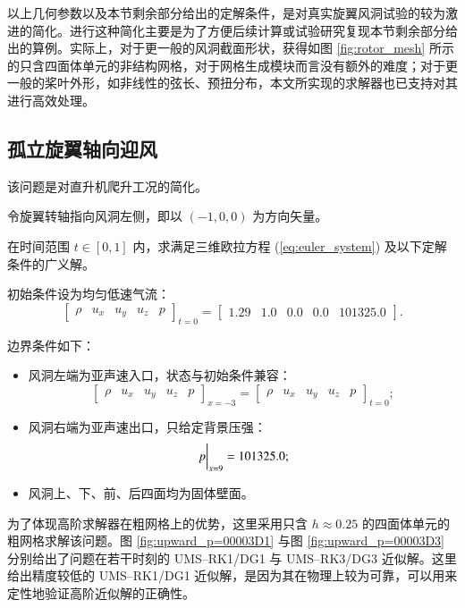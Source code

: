 以上几何参数以及本节剩余部分给出的定解条件，是对真实旋翼风洞试验的较为激进的简化。进行这种简化主要是为了方便后续计算或试验研究复现本节剩余部分给出的算例。实际上，对于更一般的风洞截面形状，获得如图
\ref{fig:rotor_mesh} 所示的只含四面体单元的非结构网格，对于网格生成模块而言没有额外的难度；对于更一般的桨叶外形，如非线性的弦长、预扭分布，本文所实现的求解器也已支持对其进行高效处理。

\subsection{孤立旋翼轴向迎风}

该问题是对直升机爬升工况的简化。
\begin{problem}
[孤立旋翼轴向迎风]\label{prob:=005B64=007ACB=0065CB=007FFC=008F74=005411=008FCE=0098CE}令旋翼转轴指向风洞左侧，即以
$(-1,0,0)$ 为方向矢量。

在时间范围 $t\in[0,1]$ 内，求满足三维欧拉方程 (\ref{eq:euler_system}) 及以下定解条件的广义解。

初始条件设为均匀低速气流：
\begin{equation}
\begin{bmatrix}\rho & u_{x} & u_{y} & u_{z} & p\end{bmatrix}_{t=0}=\begin{bmatrix}1.29 & 1.0 & 0.0 & 0.0 & 101325.0\end{bmatrix}.
\end{equation}

边界条件如下：
\begin{itemize}
\item 风洞左端为亚声速入口，状态与初始条件兼容：
\begin{equation}
\begin{bmatrix}\rho & u_{x} & u_{y} & u_{z} & p\end{bmatrix}_{x=-3}=\begin{bmatrix}\rho & u_{x} & u_{y} & u_{z} & p\end{bmatrix}_{t=0};
\end{equation}
\item 风洞右端为亚声速出口，只给定背景压强：
\begin{equation}
\eval{p}_{x=9}=101325.0;
\end{equation}
\item 风洞上、下、前、后四面均为固体壁面。\qedhere
\end{itemize}
\end{problem}

为了体现高阶求解器在粗网格上的优势，这里采用只含 $h\approx0.25$ 的四面体单元的粗网格求解该问题。图 \ref{fig:upward_p=00003D1}
与图 \ref{fig:upward_p=00003D3} 分别给出了问题在若干时刻的
UMS–RK1/DG1 与 UMS–RK3/DG3 近似解。这里给出精度较低的 UMS–RK1/DG1 近似解，是因为其在物理上较为可靠，可以用来定性地验证高阶近似解的正确性。

